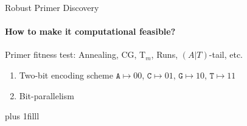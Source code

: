 \documentclass[xcolor=dvipsnames,envcountsect]{beamer}
\newcommand{\flushdown}{\vskip0pt plus 1filll}
\begin{document}
\begin{frame}{Robust Primer Discovery}
\framesubtitle{How to make it computational feasible?}
Primer fitness test: Annealing, CG, T$_m$, Runs, $(A|T)$-tail, etc.
\begin{enumerate}
    \item Two-bit encoding scheme $\texttt{A}\mapsto 00$, $\texttt{C}\mapsto 01$,  $\texttt{G}\mapsto 10$, $\texttt{T}\mapsto 11$ %
    \item<2> Bit-parallelism %
\end{enumerate}
\flushdown
\end{frame}
\end{document}
